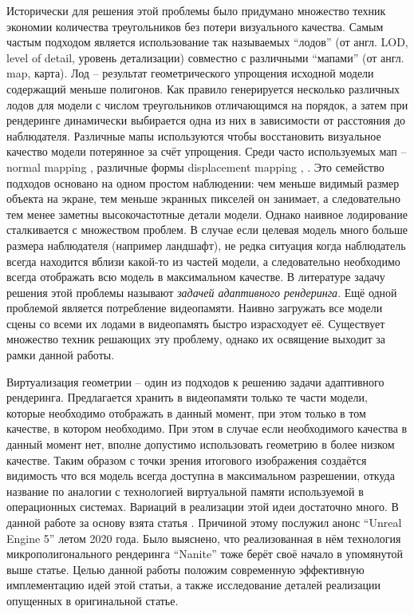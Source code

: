 \documentclass[12pt]{extarticle}
\begin{document}
Исторически для решения этой проблемы было придумано множество техник экономии количества треугольников без потери визуального качества. Самым частым подходом является использование так называемых ``лодов'' (от англ. LOD, level of detail, уровень детализации) совместно с различными ``мапами'' (от англ. map, карта). Лод -- результат геометрического упрощения исходной модели содержащий меньше полигонов. Как правило генерируется несколько различных лодов для модели с числом треугольников отличающимся на порядок, а затем при рендеринге динамически выбирается одна из них в зависимости от расстояния до наблюдателя. Различные мапы используются чтобы восстановить визуальное качество модели потерянное за счёт упрощения. Среди часто используемых мап -- normal mapping \cite{normalmapping}, различные формы displacement mapping \cite{reliefmapping}, \cite{displacementmapping}. Это семейство подходов основано на одном простом наблюдении: чем меньше видимый размер объекта на экране, тем меньше экранных пикселей он занимает, а следовательно тем менее заметны высокочастотные детали модели. Однако наивное лодирование сталкивается с множеством проблем. В случае если целевая модель много больше размера наблюдателя (например ландшафт), не редка ситуация когда наблюдатель всегда находится вблизи какой-то из частей модели, а следовательно необходимо всегда отображать всю модель в максимальном качестве. В литературе задачу решения этой проблемы называют \emph{задачей адаптивного рендеринга}. Ещё одной проблемой является потребление видеопамяти. Наивно загружать все модели сцены со всеми их лодами в видеопамять быстро израсходует её. Существует множество техник решающих эту проблему, однако их освящение выходит за рамки данной работы.

Виртуализация геометрии -- один из подходов к решению задачи адаптивного рендеринга. Предлагается хранить в видеопамяти только те части модели, которые необходимо отображать в данный момент, при этом только в том качестве, в котором необходимо. При этом в случае если необходимого качества в данный момент нет, вполне допустимо использовать геометрию в более низком качестве. Таким образом с точки зрения итогового изображения создаётся видимость что вся модель всегда доступна в максимальном разрешении, откуда название по аналогии с технологией виртуальной памяти используемой в операционных системах. Вариаций в реализации этой идеи достаточно много. В данной работе за основу взята статья \cite{niski2007multi}. Причиной этому послужил анонс ``Unreal Engine 5'' \cite{ue5} летом 2020 года. Было выяснено, что реализованная в нём технология микрополигонального рендеринга ``Nanite'' тоже берёт своё начало в упомянутой выше статье. Целью данной работы положим современную эффективную имплементацию идей этой статьи, а также исследование деталей реализации опущенных в оригинальной статье.
\end{document}

